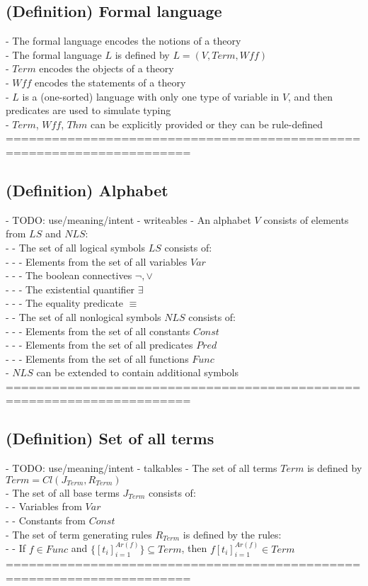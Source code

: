 \documentclass{article}
\begin{document}
\subsection{(Definition) Formal language}
	- The formal language encodes the notions of a theory \\
	- The formal language $L$ is defined by $L = (V, Term, Wff)$ \\
	- $Term$ encodes the objects of a theory \\
	- $Wff$ encodes the statements of a theory \\
	- $L$ is a (one-sorted) language with only one type of variable in $V$, and then predicates are used to simulate typing \\
	- $Term$, $Wff$, $Thm$ can be explicitly provided or they can be rule-defined
	======================================================================
\subsection{(Definition) Alphabet}
	- TODO: use/meaning/intent - writeables
	- An alphabet $V$ consists of elements from $LS$ and $NLS$: \\
		- - The set of all logical symbols $LS$ consists of: \\
			- - - Elements from the set of all variables $Var$ \\
			- - - The boolean connectives $\lnot, \lor$ \\
			- - - The existential quantifier $\exists$ \\
			- - - The equality predicate $\equiv$ \\
		- - The set of all nonlogical symbols $NLS$ consists of: \\
			- - - Elements from the set of all constants $Const$ \\
			- - - Elements from the set of all predicates $Pred$ \\
			- - - Elements from the set of all functions $Func$ \\
	- $NLS$ can be extended to contain additional symbols \\
	======================================================================
\subsection{(Definition) Set of all terms}
	- TODO: use/meaning/intent - talkables
	- The set of all terms $Term$ is defined by $Term = Cl(J_{Term}, R_{Term})$ \\
	- The set of all base terms $J_{Term}$ consists of: \\
		- - Variables from $Var$ \\
		- - Constants from $Const$ \\
	- The set of term generating rules $R_{Term}$ is defined by the rules: \\
		- - If $f \in Func$ and $\{[t_i]_{i=1}^{Ar(f)}\} \subseteq Term$, then $f [t_i]_{i=1}^{Ar(f)} \in Term$ \\
	======================================================================
\end{document}
